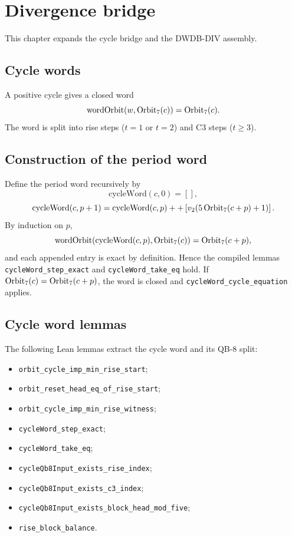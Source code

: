 \section{Divergence bridge}

This chapter expands the cycle bridge and the DWDB-DIV assembly.

\subsection{Cycle words}

A positive cycle gives a closed word
\begin{equation*}
  \mathrm{wordOrbit}(w,\mathrm{Orbit}_7(c))=\mathrm{Orbit}_7(c).
\end{equation*}
The word is split into rise steps ($t=1$ or $t=2$) and C3 steps
($t\ge3$).

\subsection{Construction of the period word}

Define the period word recursively by
\begin{equation*}
  \mathrm{cycleWord}(c,0)=[],
\end{equation*}
\begin{equation*}
  \mathrm{cycleWord}(c,p+1)=\mathrm{cycleWord}(c,p)
    ++ \left[v_2\!\left(5\,\mathrm{Orbit}_7(c+p)+1\right)\right].
\end{equation*}
By induction on $p$,
\begin{equation*}
  \mathrm{wordOrbit}(\mathrm{cycleWord}(c,p),\mathrm{Orbit}_7(c))
    =\mathrm{Orbit}_7(c+p),
\end{equation*}
and each appended entry is exact by definition.  Hence the compiled
lemmas \texttt{cycleWord\_step\_exact} and
\texttt{cycleWord\_take\_eq} hold.  If
$\mathrm{Orbit}_7(c)=\mathrm{Orbit}_7(c+p)$, the word is closed and
\texttt{cycleWord\_cycle\_equation} applies.

\subsection{Cycle word lemmas}

The following Lean lemmas extract the cycle word and its QB-8 split:
\begin{itemize}[leftmargin=*]
\item \texttt{orbit\_cycle\_imp\_min\_rise\_start};
\item \texttt{orbit\_reset\_head\_eq\_of\_rise\_start};
\item \texttt{orbit\_cycle\_imp\_min\_rise\_witness};
\item \texttt{cycleWord\_step\_exact};
\item \texttt{cycleWord\_take\_eq};
\item \texttt{cycleQb8Input\_exists\_rise\_index};
\item \texttt{cycleQb8Input\_exists\_c3\_index};
\item \texttt{cycleQb8Input\_exists\_block\_head\_mod\_five};
\item \texttt{rise\_block\_balance}.
\end{itemize}

